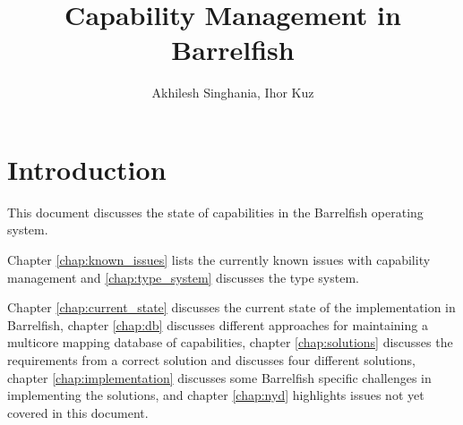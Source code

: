 \documentclass[a4paper,twoside]{report} %
\title{Capability Management in Barrelfish}   %
\author{Akhilesh Singhania, Ihor Kuz}	%
\begin{document}
\maketitle

%
%
\begin{versionhistory}
\end{versionhistory}


\chapter{Introduction}

This document discusses the state of capabilities in the Barrelfish
operating system.

Chapter \ref{chap:known_issues} lists the currently known issues with
capability management and \ref{chap:type_system} discusses the type
system.

Chapter \ref{chap:current_state} discusses the current state of the
implementation in Barrelfish, chapter \ref{chap:db} discusses
different approaches for maintaining a multicore mapping database of
capabilities, chapter \ref{chap:solutions} discusses the requirements
from a correct solution and discusses four different solutions,
chapter \ref{chap:implementation} discusses some Barrelfish specific
challenges in implementing the solutions, and chapter \ref{chap:nyd}
highlights issues not yet covered in this document.

\end{document}

